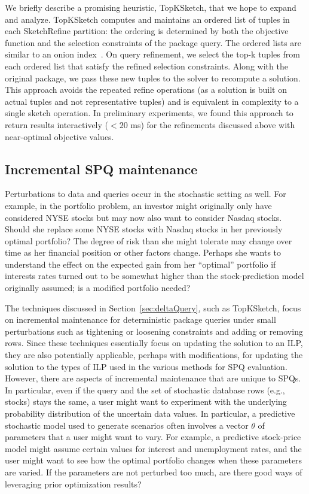 \documentclass[11pt]{article}
\newcommand{\skref}{{\sc SketchRefine}\xspace}
\newcommand{\unitopk}{{\sf \sc TopKSketch}\xspace}
\begin{document}
We briefly describe a promising heuristic, \unitopk, that we hope to expand and analyze.  \unitopk computes and maintains an ordered list of tuples in each \skref partition: the ordering is determined by both the objective function and the selection constraints of the package query. The ordered lists are similar to an onion index~\cite{onion}. On query refinement, we select the top-k tuples from each ordered list that satisfy the refined selection constraints. Along with the original package, we pass these new tuples to the solver to recompute a solution. This approach avoids the repeated refine operations (as a solution is built on actual tuples and not representative tuples) and is equivalent in complexity to a single sketch operation. In preliminary experiments, we found this approach to return results interactively ($< 20$ ms) for the refinements discussed above with near-optimal objective values.

\subsection{Incremental SPQ maintenance}\label{sec:incSPQ}

Perturbations to data and queries occur in the stochastic setting as well. For example, in the portfolio problem, an investor might originally only have considered NYSE stocks but may now also want to consider Nasdaq stocks. Should she replace some NYSE stocks with Nasdaq stocks in her previously optimal portfolio? The degree of risk than she might tolerate may change over time as her financial position or other factors change. Perhaps she wants to understand the effect on the expected gain from her ``optimal'' portfolio if interests rates turned out to be somewhat higher than the stock-prediction model originally assumed; is a modified portfolio needed? 

The techniques discussed in Section~\ref{sec:deltaQuery}, such as \unitopk, focus on incremental maintenance for deterministic package queries under small perturbations such as tightening or loosening constraints and adding or removing rows. Since these techniques essentially focus on updating the solution to an ILP, they are also potentially applicable, perhaps with modifications, for updating the solution to the types of ILP used in the various methods for SPQ evaluation. However, there are aspects of incremental maintenance that are unique to SPQs. In particular, even if the query and the set of stochastic database rows (e.g., stocks) stays the same, a user might want to experiment with the underlying probability distribution of the uncertain data values. In particular, a predictive stochastic model used to generate scenarios often involves a vector $\theta$ of parameters that a user might want to vary. For example, a predictive stock-price model might assume certain values for interest and unemployment rates, and the user might want to see how the optimal portfolio changes when these parameters are varied. If the parameters are not perturbed too much, are there good ways of leveraging prior optimization results?
\end{document}
